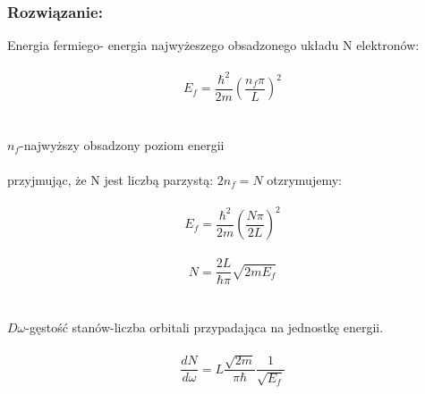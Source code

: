 \subsubsection*{Rozwiązanie:}
Energia fermiego- energia najwyżeszego obsadzonego układu N elektronów:
\\
\\
\begin{equation}
E_f=\frac{\hbar^2}{2m}(\frac{n_f\pi}{L})^2
\end{equation}
\\
\\
$n_f$-najwyższy obsadzony poziom energii
\\
\\
przyjmując, że N jest liczbą parzystą: $2n_f=N$ otzrymujemy:
\\
\\
\begin{equation}
E_f=\frac{\hbar^2}{2m}(\frac{N\pi}{2L})^2
\end{equation}
\\
\begin{equation}
N=\frac{2L}{\hbar \pi}\sqrt{2mE_f}
\end{equation}
\\
\\
$D{\omega}$-gęstość stanów-liczba orbitali przypadająca na jednostkę energii.
\\
\\
\begin{equation}
\frac{dN}{d\omega}=L\frac{\sqrt{2m}}{\pi \hbar}\frac{1}{\sqrt{E_f}}
\end{equation}\hrulefill

